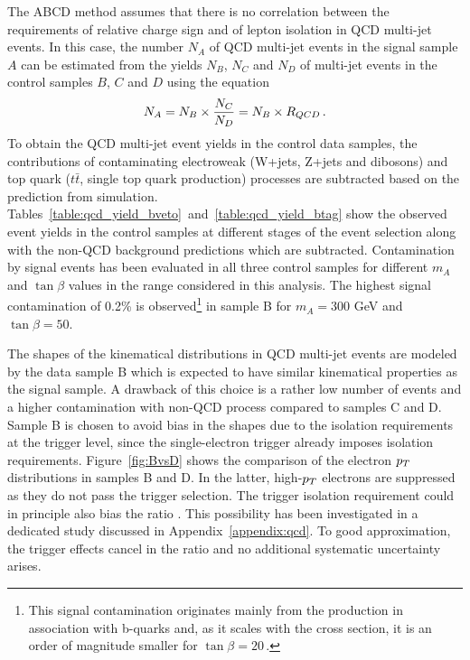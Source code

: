 The ABCD method assumes that there is no correlation between the requirements of relative 
charge sign and of lepton isolation in QCD multi-jet events. In this case, the number $N_{A}$ of QCD multi-jet events in the signal sample $A$ 
can be estimated from the yields $N_B$, $N_C$ and $N_D$  of multi-jet events in the control samples $B$, $C$ and $D$ using the equation
\begin{equation} \label{eqn:qcdest}
N_{A}  = N_{B} \times \frac{N_{C}}{N_{D}} =  N_{B} \times R_{QCD} \,.
\end{equation}
To obtain the  QCD multi-jet event yields in the control data samples, the contributions of
contaminating electroweak (W+jets, Z+jets and dibosons) and top quark 
($t\bar{t}$,  single top quark production) processes are  subtracted based on the prediction from simulation.
Tables~\ref{table:qcd_yield_bveto}~and~\ref{table:qcd_yield_btag}
show the observed event yields in the control samples at different stages of the event selection along with the
non-QCD background predictions  which are subtracted.
Contamination by signal events has been evaluated in all  three control samples for different  $m_{A}$ and $\tan\beta$ values in the
range considered in this analysis. The highest signal contamination of 0.2\% is observed\footnote{
This signal contamination originates mainly from the production in association with b-quarks and,
as it scales with the cross section, it is an order of magnitude smaller for $\tan\beta = 20\,.$
} in sample B for $m_{A} = 300$ GeV and $\tan\beta = 50$.

The shapes of the kinematical distributions in QCD multi-jet events 
are modeled  by the data sample B which is expected to have similar kinematical properties as   the signal sample.
A drawback of this choice is a rather low number of events and a higher contamination with non-QCD process compared to samples C and D.
Sample B is chosen  to avoid  bias in the shapes due to the isolation requirements at the trigger level, since the single-electron trigger 
already imposes isolation requirements. 
Figure~\ref{fig:BvsD} shows the comparison of the electron $p_{T}$ distributions in samples B and D. In the latter, 
high-$p_{T}$ electrons are suppressed as they do not pass the trigger selection. 
The trigger isolation requirement could in principle also 
bias the ratio \rqcd. This possibility has been investigated 
in a dedicated study discussed in Appendix~\ref{appendix:qcd}.
To  good approximation, the  trigger effects cancel  in the ratio
\rqcd and no additional systematic uncertainty arises.

